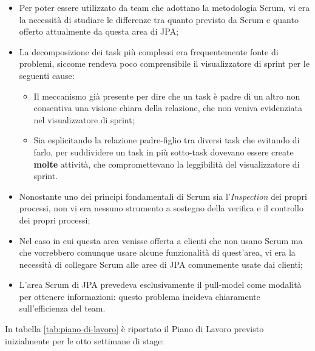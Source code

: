 \begin{itemize}
\item Per poter essere utilizzato da team che adottano la metodologia Scrum,
  vi era la necessità di studiare le differenze tra quanto previsto da Scrum e
  quanto offerto attualmente da questa area di JPA;
\item La decomposizione dei task più complessi era frequentemente fonte di
  problemi, siccome rendeva poco comprensibile il visualizzatore di sprint per
  le seguenti cause:
  \begin{itemize}
  \item Il meccanismo già presente per dire che un task è padre di un altro non
    consentiva una visione chiara della relazione, che non veniva evidenziata
    nel visualizzatore di sprint;
  \item Sia esplicitando la relazione padre-figlio tra diversi task che
    evitando di farlo, per suddividere un task in più sotto-task dovevano
    essere create \textbf{molte} attività, che compromettevano la leggibilità
    del visualizzatore di sprint.
  \end{itemize}
\item Nonostante uno dei principi fondamentali di Scrum sia l'\emph{Inspection}
  dei propri processi, non vi era nessuno strumento a sostegno della verifica
  e il controllo dei propri processi;
\item Nel caso in cui questa area venisse offerta a clienti che non usano
  Scrum ma che vorrebbero comunque usare alcune funzionalità di quest'area, vi
  era la necessità di collegare Scrum alle aree di JPA comunemente usate dai
  clienti;
\item L'area Scrum di JPA prevedeva esclusivamente il \gls{pull-model} come
  modalità per ottenere informazioni: questo problema incideva chiaramente
  sull'efficienza del team.
\end{itemize}

In tabella \ref{tab:piano-di-lavoro} è riportato il Piano di Lavoro previsto
inizialmente per le otto settimane di stage: \\

